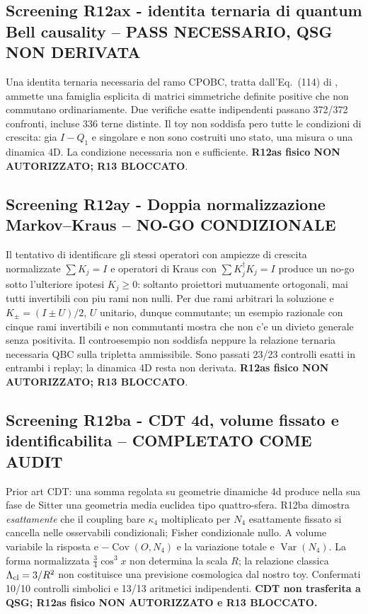 \documentclass[11pt,a4paper]{article}
\begin{document}
\subsection*{Screening R12ax - identita ternaria di quantum Bell causality -- PASS NECESSARIO, QSG NON DERIVATA}
Una identita ternaria necessaria del ramo CPOBC, tratta dall'Eq.~(114) di \cite{SrivastavaSurya2026}, ammette una famiglia esplicita di matrici simmetriche definite positive che non commutano ordinariamente. Due verifiche esatte indipendenti passano 372/372 confronti, incluse 336 terne distinte. Il toy non soddisfa pero tutte le condizioni di crescita: gia $I-Q_1$ e singolare e non sono costruiti uno stato, una misura o una dinamica 4D. La condizione necessaria non e sufficiente. \textbf{R12as fisico NON AUTORIZZATO; R13 BLOCCATO}.\par\medskip

\subsection*{Screening R12ay - Doppia normalizzazione Markov--Kraus -- NO-GO CONDIZIONALE}
Il tentativo di identificare gli stessi operatori con ampiezze di crescita normalizzate $\sum K_j=I$ e operatori di Kraus con $\sum K_j^\dagger K_j=I$ produce un no-go sotto l'ulteriore ipotesi $K_j\ge0$: soltanto proiettori mutuamente ortogonali, mai tutti invertibili con piu rami non nulli. Per due rami arbitrari la soluzione e $K_\pm=(I\pm U)/2$, $U$ unitario, dunque commutante; un esempio razionale con cinque rami invertibili e non commutanti mostra che non c'e un divieto generale senza positivita. Il controesempio non soddisfa neppure la relazione ternaria necessaria QBC sulla tripletta ammissibile. Sono passati 23/23 controlli esatti in entrambi i replay; la dinamica 4D resta non derivata. \textbf{R12as fisico NON AUTORIZZATO; R13 BLOCCATO}.\par\medskip

\subsection*{Screening R12ba - CDT 4d, volume fissato e identificabilita -- COMPLETATO COME AUDIT}
Prior art CDT: una somma regolata su geometrie dinamiche 4d produce nella sua fase de Sitter una geometria media euclidea tipo quattro-sfera. R12ba dimostra \emph{esattamente} che il coupling bare $\kappa_4$ moltiplicato per $N_4$ esattamente fissato si cancella nelle osservabili condizionali; Fisher condizionale nullo. A volume variabile la risposta e $-\operatorname{Cov}(O,N_4)$ e la variazione totale e $\operatorname{Var}(N_4)$. La forma normalizzata $\frac34\cos^3 x$ non determina la scala $R$; la relazione classica $\Lambda_{\rm cl}=3/R^2$ non costituisce una previsione cosmologica dal nostro toy. Confermati 10/10 controlli simbolici e 13/13 aritmetici indipendenti. \textbf{CDT non trasferita a QSG; R12as fisico NON AUTORIZZATO e R13 BLOCCATO.}\par\medskip
\end{document}
